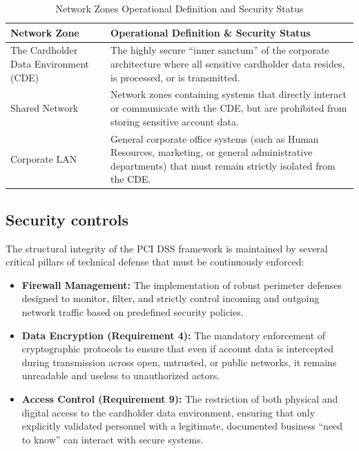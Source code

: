\documentclass[12pt,a4paper,oneside]{report}
\begin{document}
	\begin{table}[h!]
		\centering
		\caption{Network Zones Operational Definition and Security Status}
		\label{tab:network_zones}
		\begin{tabular}{p{5cm} p{10cm}}
			\toprule
			\textbf{Network Zone} & \textbf{Operational Definition \& Security Status} \\
			\midrule
			The Cardholder Data Environment (CDE) & The highly secure ``inner sanctum'' of the corporate architecture where all sensitive cardholder data resides, is processed, or is transmitted. \\
			\midrule
			Shared Network & Network zones containing systems that directly interact or communicate with the CDE, but are prohibited from storing sensitive account data. \\
			\midrule
			Corporate LAN & General corporate office systems (such as Human Resources, marketing, or general administrative departments) that must remain strictly isolated from the CDE. \\
			\bottomrule
		\end{tabular}
	\end{table}
	
	\subsection{Security controls}
	The structural integrity of the PCI DSS framework is maintained by several critical pillars of technical defense that must be continuously enforced:
	\begin{itemize}
		\item \textbf{Firewall Management:} The implementation of robust perimeter defenses designed to monitor, filter, and strictly control incoming and outgoing network traffic based on predefined security policies.
		\item \textbf{Data Encryption (Requirement 4):} The mandatory enforcement of cryptographic protocols to ensure that even if account data is intercepted during transmission across open, untrusted, or public networks, it remains unreadable and useless to unauthorized actors.
		\item \textbf{Access Control (Requirement 9):} The restriction of both physical and digital access to the cardholder data environment, ensuring that only explicitly validated personnel with a legitimate, documented business ``need to know'' can interact with secure systems.
	\end{itemize}
	
\end{document}
